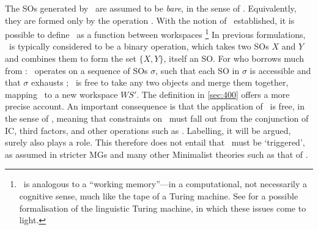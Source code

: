The SOs generated by \CHL\ are assumed to be \textit{bare}, in the sense of \textcite{ChomskyN_1994}. Equivalently, they are formed only by the operation \MERGE. With the notion of \WS\ established, it is possible to define \MERGE\ as a function between workspaces%
\footnote{\WS\ is analogous to a ``working memory''---in a computational, not necessarily a cognitive sense, much like the tape of a Turing machine. See \textcite{WatumullJ_2012,WatumullJ_2015} for a possible formalisation of the linguistic Turing machine, in which these issues come to light.}
In previous formulations, \MERGE\ is typically considered to be a binary operation, which takes two SOs $X$ and $Y$ and combines them to form the set $\{X,Y\}$, itself an SO. For \textcite{ChomskyN_2021} who borrows much from : \MERGE\ operates on a sequence of SOs $\sigma$, such that each SO in $\sigma$ is accessible and that $\sigma$ exhausts \WS; \MERGE\ is free to take any two objects and merge them together, mapping \WS\ to a new workspace $WS'$. The definition in \autoref{sec:400} offers a more precise account. An important consequence is that the application of \MERGE\ is free, in the sense of \textcite{ChomskyN.etal_2019}, meaning that constraints on \MERGE\ must fall out from the conjunction of IC, third factors, and other operations such as \AGREE. Labelling, it will be argued, surely also plays a role. This therefore does not entail that \MERGE\ must be `triggered', as assumed in stricter MGs and many other Minimalist theories such as that of \textcite{AdgerD_2003}.

